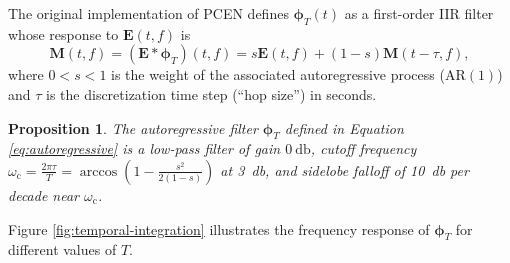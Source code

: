 \documentclass[journal]{IEEEtran}
\newtheorem{prop}[thm]{Proposition}
\theoremstyle{remark}
\begin{document}
The original implementation of PCEN \cite{wang2017icassp} defines $\boldsymbol{\phi}_T (t)$ as a first-order IIR filter whose response to $\mathbf{E}(t,f)$ is
\begin{equation}
\mathbf{M}(t,f) = (\mathbf{E} \ast \boldsymbol{\phi}_T)(t,f) = s \mathbf{E}(t,f) + (1-s) \mathbf{M}(t - \tau,f),
\label{eq:autoregressive}
\end{equation}
where $0<s<1$ is the weight of the associated autoregressive process ($\mathrm{AR}(1)$) and $\tau$ is the discretization time step (``hop size'') in seconds.

\begin{prop}
The autoregressive filter $\boldsymbol{\phi}_T$ defined in Equation \ref{eq:autoregressive} is a low-pass filter of gain $\SI{0}{\decibel}$, cutoff frequency
$\omega_\mathrm{c} = \frac{2\pi\tau}{T} = \arccos(1 - \frac{s^2}{2 (1-s)})$ at \SI{3}{\decibel}, and sidelobe falloff of \SI{10}{\decibel} per decade near $\omega_\mathrm{c}$.
\label{prop:temporal-integration}
\end{prop}

Figure \ref{fig:temporal-integration} illustrates the frequency response of $\boldsymbol{\phi}_T$ for different values of $T$.
\end{document}
